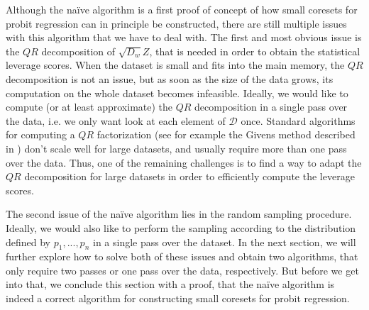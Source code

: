 Although the na\"ive algorithm is a first proof of concept of how small coresets
for probit regression can in principle be constructed,
there are still multiple issues with this algorithm that
we have to deal with.
The first and most obvious issue is the $QR$ decomposition of
$\sqrt{D_w}Z$, that is needed in order to obtain
the statistical leverage scores.
When the dataset is small and fits into the main
memory, the $QR$ decomposition is not an issue, but as soon as
the size of the data grows, its computation on the whole dataset
becomes infeasible. Ideally, we would like to compute
(or at least approximate) the $QR$ decomposition in a single
pass over the data, i.e. we only want look at each element
of $\mathcal{D}$ once.
Standard algorithms for computing a $QR$ factorization
(see for example the Givens method described in
\cite{matrix-computations}) don't scale well for large datasets,
and usually require more than one pass over the data.
Thus, one of the remaining challenges is to find a way to
adapt the $QR$ decomposition for large datasets in order
to efficiently compute the leverage scores.

The second issue of the na\"ive algorithm lies in the
random sampling procedure. Ideally, we would also like to
perform the sampling according to the distribution defined
by $p_1, ..., p_n$ in a single pass over the dataset.
In the next section, we will further explore how to solve
both of these issues and obtain two algorithms, that only require
two passes or one pass over the data, respectively.
But before we get into that, we conclude this section with a
proof, that the na\"ive algorithm is indeed a correct algorithm
for constructing small coresets for probit regression.

